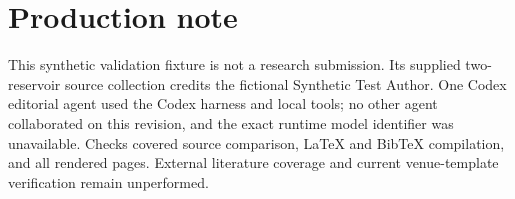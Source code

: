 \section*{Production note}
This synthetic validation fixture is not a research submission. Its supplied two-reservoir source collection credits the fictional Synthetic Test Author. One Codex editorial agent used the Codex harness and local tools; no other agent collaborated on this revision, and the exact runtime model identifier was unavailable. Checks covered source comparison, LaTeX and BibTeX compilation, and all rendered pages. External literature coverage and current venue-template verification remain unperformed.
